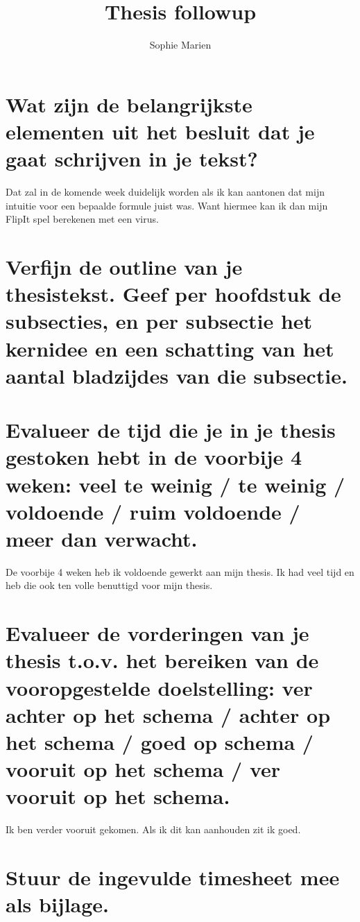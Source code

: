 \documentclass[a4paper, 11pt]{article}
\begin{document}
\begin{titlepage}
\title{Thesis followup}
\author{Sophie Marien}
\end{titlepage}



\maketitle


\section{Wat zijn de belangrijkste elementen uit het besluit dat je gaat schrijven in je tekst?}
Dat zal in de komende week duidelijk worden als ik kan aantonen dat mijn intuitie voor een bepaalde formule juist was. Want hiermee kan ik dan mijn FlipIt spel berekenen met een virus.
\section{Verfijn de outline van je thesistekst. Geef per hoofdstuk de subsecties, en per subsectie het kernidee en een schatting van het aantal bladzijdes van die subsectie.}


\section{Evalueer de tijd die je in je thesis gestoken hebt in de voorbije 4 weken: veel te weinig / te weinig / voldoende / ruim voldoende / meer dan verwacht.}
De voorbije 4 weken heb ik voldoende gewerkt aan mijn thesis. Ik had veel tijd en heb die ook ten volle benuttigd voor mijn thesis. 
\section{Evalueer de vorderingen van je thesis t.o.v. het bereiken van de vooropgestelde doelstelling: ver achter op het schema / achter op het schema / goed op schema / vooruit op het schema / ver vooruit op het schema.}
Ik ben verder vooruit gekomen. Als ik dit kan aanhouden zit ik goed.
\section{Stuur de ingevulde timesheet mee als bijlage.}









 
\end{document}
